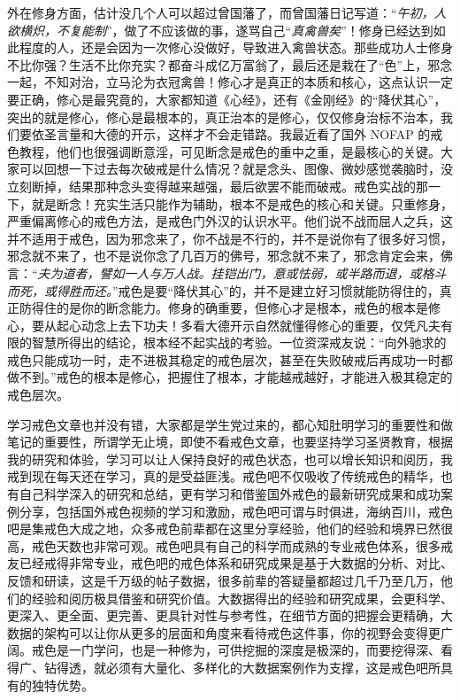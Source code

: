 外在修身方面，估计没几个人可以超过曾国藩了，而曾国藩日记写道：“\textit{午初，人欲横炽，不复能制}”，做了不应该做的事，遂骂自己“\textit{真禽兽矣}”！修身已经达到如此程度的人，还是会因为一次修心没做好，导致进入禽兽状态。那些成功人士修身不比你强？生活不比你充实？都奋斗成亿万富翁了，最后还是栽在了“色”上，邪念一起，不知对治，立马沦为衣冠禽兽！修心才是真正的本质和核心，这点认识一定要正确，修心是最究竟的，大家都知道《心经》，还有《金刚经》的“降伏其心”，突出的就是修心，修心是最根本的，真正治本的是修心，仅仅修身治标不治本，我们要依圣言量和大德的开示，这样才不会走错路。我最近看了国外 NOFAP 的戒色教程，他们也很强调断意淫，可见断念是戒色的重中之重，是最核心的关键。大家可以回想一下过去每次破戒是什么情况？就是念头、图像、微妙感觉袭脑时，没立刻断掉，结果那种念头变得越来越强，最后欲罢不能而破戒。戒色实战的那一下，就是断念！充实生活只能作为辅助，根本不是戒色的核心和关键。只重修身，严重偏离修心的戒色方法，是戒色门外汉的认识水平。他们说不战而屈人之兵，这并不适用于戒色，因为邪念来了，你不战是不行的，并不是说你有了很多好习惯，邪念就不来了，也不是说你念了几百万的佛号，邪念就不来了，邪念肯定会来，佛言：“\textit{夫为道者，譬如一人与万人战。挂铠出门，意或怯弱，或半路而退，或格斗而死，或得胜而还。}”戒色是要“降伏其心”的，并不是建立好习惯就能防得住的，真正防得住的是你的断念能力。修身的确重要，但修心才是根本，戒色的根本是修心，要从起心动念上去下功夫！多看大德开示自然就懂得修心的重要，仅凭凡夫有限的智慧所得出的结论，根本经不起实战的考验。一位资深戒友说：“向外驰求的戒色只能成功一时，走不进极其稳定的戒色层次，甚至在失败破戒后再成功一时都做不到。”戒色的根本是修心，把握住了根本，才能越戒越好，才能进入极其稳定的戒色层次。

学习戒色文章也并没有错，大家都是学生党过来的，都心知肚明学习的重要性和做笔记的重要性，所谓学无止境，即使不看戒色文章，也要坚持学习圣贤教育，根据我的研究和体验，学习可以让人保持良好的戒色状态，也可以增长知识和阅历，我戒到现在每天还在学习，真的是受益匪浅。戒色吧不仅吸收了传统戒色的精华，也有自己科学深入的研究和总结，更有学习和借鉴国外戒色的最新研究成果和成功案例分享，包括国外戒色视频的学习和激励，戒色吧可谓与时俱进，海纳百川，戒色吧是集戒色大成之地，众多戒色前辈都在这里分享经验，他们的经验和境界已然很高，戒色天数也非常可观。戒色吧具有自己的科学而成熟的专业戒色体系，很多戒友已经戒得非常专业，戒色吧的戒色体系和研究成果是基于大数据的分析、对比、反馈和研读，这是千万级的帖子数据，很多前辈的答疑量都超过几千乃至几万，他们的经验和阅历极具借鉴和研究价值。大数据得出的经验和研究成果，会更科学、更深入、更全面、更完善、更具针对性与参考性，在细节方面的把握会更精确，大数据的架构可以让你从更多的层面和角度来看待戒色这件事，你的视野会变得更广阔。戒色是一门学问，也是一种修为，可供挖掘的深度是极深的，而要挖得深、看得广、钻得透，就必须有大量化、多样化的大数据案例作为支撑，这是戒色吧所具有的独特优势。

